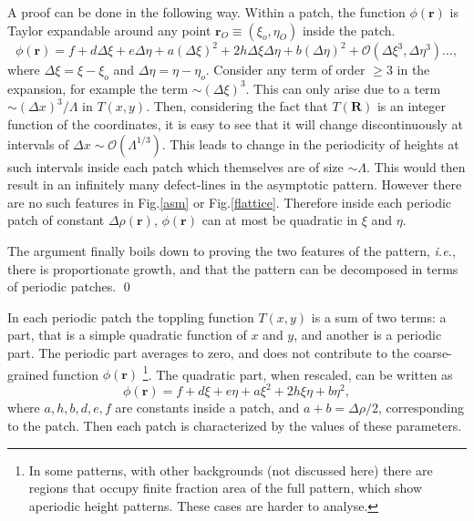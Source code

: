 \documentclass[11pt,a4paper]{book}
\begin{document}
A proof can be done in the following way.
Within a patch, the function $\phi(\mathbf{r})$ is
Taylor expandable around any point $\mathbf{r}_{O}\equiv\left(
\xi_{o},\eta_{O}\right)$ inside the patch.
\begin{equation}
\phi\left( \mathbf{r}
\right)=f+d\Delta\xi+e\Delta\eta+a\left(\Delta\xi\right)^{2}+2h\Delta\xi\Delta\eta+b\left(\Delta\eta\right)^{2}+\mathcal{O}\left(
\Delta\xi^{3},\Delta\eta^{3} \right)\dots,
\end{equation}
where $\Delta\xi=\xi-\xi_{o}$ and $\Delta\eta=\eta-\eta_{o}$.
Consider any term
of order $\ge 3$ in the expansion, for example the term
$\sim(\Delta\xi)^3$. This can only arise due to a term $\sim (\Delta
x)^3/\Lambda$ in $T(x,y)$. Then, considering the fact that $T\left(
\mathbf{R} \right)$ is an integer function of the coordinates, it is easy
to see that it will 
change discontinuously at intervals of $\Delta x \sim
\mathcal{O}(\Lambda^{1/3})$.
This leads to change in the periodicity of heights at such intervals
inside each patch which themselves are of size $\sim\Lambda$. This
would then result in an infinitely many defect-lines in the asymptotic pattern. However
there are no such features in Fig.\ref{asm} or Fig.\ref{flattice}.
Therefore inside each periodic patch of constant $\Delta\rho(\mathbf{r})$,
$\phi(\mathbf{r})$ can at most be quadratic in $\xi$ and $\eta$.

The argument finally boils down to proving the two features of the
pattern, \textit{i.e.}, there is proportionate growth, and that the
pattern can be decomposed in terms of periodic patches.
\qed


In
each periodic patch the toppling function $T(x,y)$ is a sum of two 
terms: a 
part, that is a simple quadratic function of $x$ and $y$, and another
is a periodic 
part. The periodic part averages to zero, and does not contribute to the 
coarse-grained function $\phi(\mathbf{r})$ \footnote{In some patterns, 
with other backgrounds (not discussed here) there are 
regions that occupy finite fraction area of the full pattern, which show aperiodic height 
patterns. These cases are harder to analyse.}. The quadratic part,
when rescaled, can be written as
\begin{equation}
\phi\left( \mathbf{r}\right)=f+d\xi+e\eta+a\xi^{2}+2h\xi\eta+b\eta^{2},
\end{equation}
where $a,h,b,d,e,f$ are constants inside a patch, and
$a+b=\Delta\rho/2$, corresponding to the patch. Then each patch is
characterized by the values of these parameters.
\end{document}
